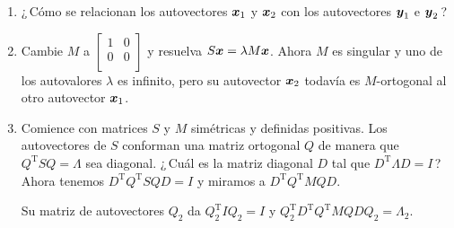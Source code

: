 \documentclass[12pt,a4paper]{article}
\newcommand{\bi}[1]{\hbox{\boldmath$#1$}}
\newcommand\1{\mbox{\,\vrule height-0.8pt depth1.0pt width2pc\,}}
\newcommand\2{\mbox{\,\vrule height-0.8pt depth1.0pt width1pc\,}}
\DeclareRobustCommand\transp{^{\mathrm{T}}}
\begin{document}
\begin{enumerate}
\item ¿\,Cómo se relacionan los autovectores $\bi{x}_1$ y $\bi{x}_2$ con los autovectores $\bi{y}_1$ e $\bi{y}_2$\,?
\item Cambie $M$ a $\left[\begin{array}{rr}1&0\\0&0\\\end{array}\right]$ y resuelva $S\bi{x}=\lambda M\bi{x}$. Ahora $M$ es singular y uno de los autovalores $\lambda$ es infinito, pero su autovector $\bi{x}_2$ todavía es $M$-ortogonal al otro autovector $\bi{x}_1$.
\item Comience con   matrices  $S$ y $M$ simétricas y definidas positivas. Los autovectores de $S$ conforman una matriz ortogonal $Q$ de manera que $Q\transp SQ=\Lambda$ sea diagonal. ¿\,Cuál es la matriz diagonal $D$ tal que $D\transp\Lambda D=I$\,? Ahora tenemos $D\transp Q\transp SQD=I$ y miramos a $D\transp Q\transp MQD$.

Su matriz de autovectores $Q_2$ da $Q_2\transp IQ_2=I$ y $Q_2\transp D\transp Q\transp MQDQ_2=\Lambda_2.$ %


\end{enumerate}
\end{document}
